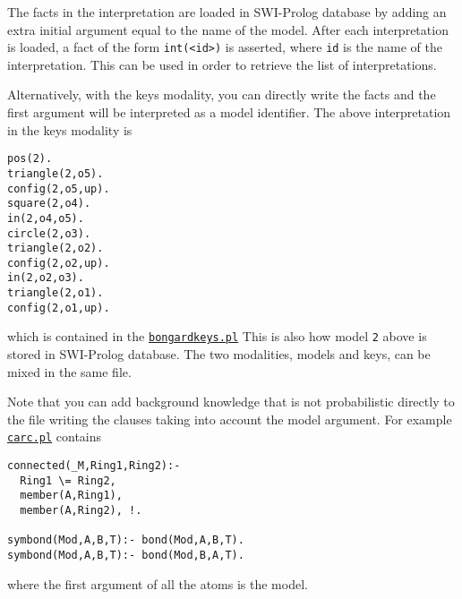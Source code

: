 The facts in the interpretation are loaded in SWI-Prolog database by adding an extra initial argument equal to the name of the model.
After each interpretation is loaded, a fact of the form \verb|int(<id>)| is asserted, where \verb|id| is the name of the interpretation. This can be used in
order to retrieve the list of interpretations.

Alternatively, with the keys modality, you can directly write the facts and the first argument will be interpreted as a model identifier. The above interpretation in the keys modality is
\begin{verbatim}
pos(2).
triangle(2,o5).
config(2,o5,up).
square(2,o4).
in(2,o4,o5).
circle(2,o3).
triangle(2,o2).
config(2,o2,up).
in(2,o2,o3).
triangle(2,o1).
config(2,o1,up).
\end{verbatim}
which is contained in the \href{http://cplint.lamping.unife.it/example/bongardkeys.pl}{\texttt{bongardkeys.pl}}
This is also how model \verb|2| above is stored in SWI-Prolog database.
The two modalities, models and keys, can be mixed in the same file.

Note that you can add background knowledge that is not probabilistic directly to the file writing the clauses taking into account the model argument. For example \href{http://cplint.lamping.unife.it/example/carc.pl}{\texttt{carc.pl}}
contains
\begin{verbatim}
connected(_M,Ring1,Ring2):-
  Ring1 \= Ring2,
  member(A,Ring1),
  member(A,Ring2), !.

symbond(Mod,A,B,T):- bond(Mod,A,B,T).
symbond(Mod,A,B,T):- bond(Mod,B,A,T).
\end{verbatim}
where the first argument of all the atoms is the model.

